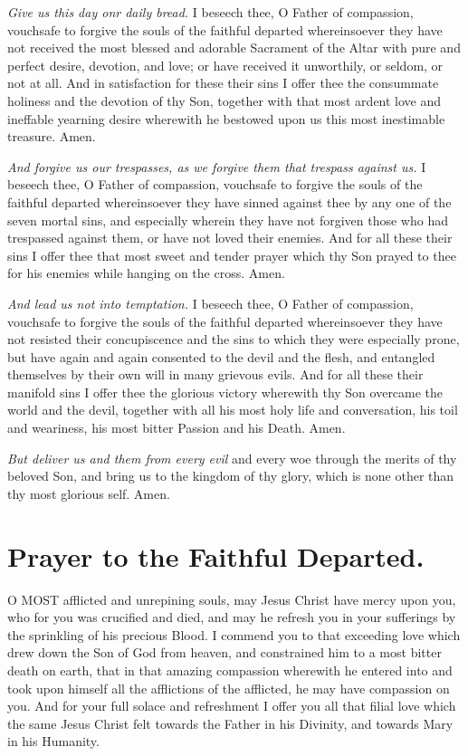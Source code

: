 \documentclass[a5paper,12pt]{memoir}
\begin{document}
\emph{Give us this day 
onr daily bread.} I 
beseech thee, O Father of compassion, 
vouchsafe to forgive 
the souls of the faithful departed whereinsoever they have not 
received the most 
blessed and adorable 
Sacrament of the Altar with pure and perfect desire, devotion, 
and love; or have received it unworthily, 
or seldom, or not at 
all. And in satisfaction for these their sins 
I offer thee the consummate holiness and 
the devotion of thy 
Son, together with 
that most ardent love 
and ineffable yearning desire wherewith 
he bestowed upon us 
this most inestimable 
treasure. Amen. 

\emph{And forgive us our 
trespasses, as we forgive them that trespass 
against us.} I beseech 
thee, O Father of compassion, vouchsafe to 
forgive the souls of 
the faithful departed 
whereinsoever they 
have sinned against 
thee by any one of 
the seven mortal sins, 
and especially wherein they have not forgiven those who had 
trespassed against 
them, or have not 
loved their enemies. 
And for all these their 
sins I offer thee that 
most sweet and tender 
prayer which thy Son 
prayed to thee for his 
enemies while hanging on the cross. Amen. 

\emph{And lead us not into 
temptation.} I beseech thee, O Father 
of compassion, vouchsafe to forgive the 
souls of the faithful 
departed whereinsoever they have not resisted their concupiscence and the sins to 
which they were especially prone, but have 
again and again consented to the devil 
and the flesh, and entangled themselves by 
their own will in many 
grievous evils. And 
for all these their manifold sins I offer thee 
the glorious victory 
wherewith thy Son 
overcame the world 
and the devil, together with all his most 
holy life and conversation, his toil and 
weariness, his most 
bitter Passion and his 
Death. Amen. 

\emph{But deliver us and 
them from every evil} 
and every woe through 
the merits of thy beloved Son, and bring 
us to the kingdom of 
thy glory, which is 
none other than thy 
most glorious self. Amen. 


\section{Prayer to the Faithful Departed.}

O MOST afflicted 
and unrepining 
souls, may Jesus Christ 
have mercy upon you, 
who for you was crucified and died, and 
may he refresh you in 
your sufferings by the 
sprinkling of his precious Blood. I commend you to that exceeding love which 
drew down the Son of 
God from heaven, and 
constrained him to a 
most bitter death on 
earth, that in that 
amazing compassion 
wherewith he entered 
into and took upon 
himself all the afflictions of the afflicted, 
he may have compassion on you. And for 
your full solace and 
refreshment I offer 
you all that filial love 
which the same Jesus 
Christ felt towards the 
Father in his Divinity, and towards Mary 
in his Humanity. 
\end{document}
